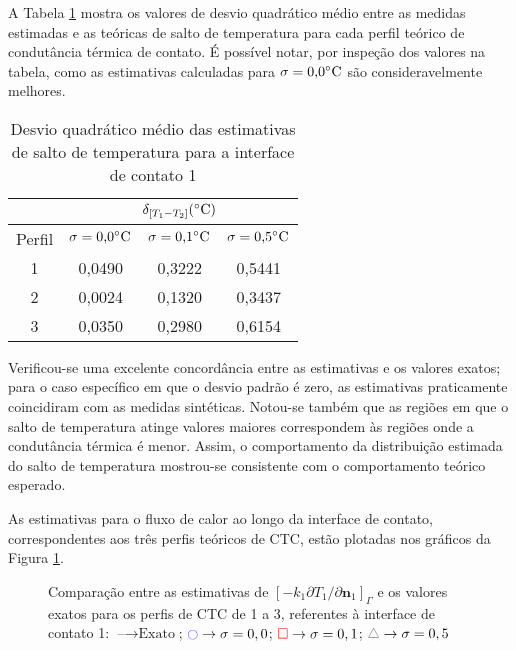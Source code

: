 A Tabela \ref{tabela_rms_delta_temperaturas_interface_1} mostra os valores de desvio quadrático médio entre as medidas estimadas e as teóricas de salto de temperatura para cada perfil teórico de condutância térmica de contato. É possível notar, por inspeção dos valores na tabela, como as estimativas calculadas para $\sigma = \text{0,0}\celsius$ são consideravelmente melhores.
\begin{table}[H]
	\centering
	\caption{Desvio quadrático médio das estimativas de salto de temperatura para a interface de contato 1}
	\begin{tabular}{c|c|c|c|}
		\cline{2-4}
		& \multicolumn{3}{c|}{$\delta_{[T_1 - T_2]} (\celsius)$} \\ \hline
		\multicolumn{1}{|c|}{Perfil} & $\sigma = \text{0,0}\celsius$   & $\sigma = \text{0,1}\celsius$    & $\sigma = \text{0,5}\celsius$  \\ \hline
		\multicolumn{1}{|c|}{1}      &  0,0490      & 0,3222       & 0,5441       \\ \hline
		\multicolumn{1}{|c|}{2}      &  0,0024      & 0,1320       & 0,3437      \\ \hline
		\multicolumn{1}{|c|}{3}      &  0,0350      & 0,2980       & 0,6154      \\ \hline
	\end{tabular}
	\label{tabela_rms_delta_temperaturas_interface_1}
\end{table}

Verificou-se uma excelente concordância entre as estimativas e os valores exatos; para o caso específico em que o desvio padrão é zero, as estimativas praticamente coincidiram com as medidas sintéticas. Notou-se também que as regiões em que o salto de temperatura atinge valores maiores correspondem às regiões onde a condutância térmica é menor. Assim, o comportamento da distribuição estimada do salto de temperatura mostrou-se consistente com o comportamento teórico esperado.

As estimativas para o fluxo de calor ao longo da interface de contato, correspondentes aos três perfis teóricos de CTC, estão plotadas nos gráficos da Figura \ref{figura_fluxo_calor_interface_01}.  
\begin{figure}[H]
	\caption{Comparação entre as estimativas de $[-k_1 {\partial T_1}/{\partial\mathbf{n}_1}]_\Gamma$ e os valores exatos para os perfis de CTC de 1 a 3, referentes à interface de contato 1: $\text{--} \rightarrow \text{Exato}$; $\textcolor{blue}{\ocircle} \rightarrow \sigma = 0,0$; $\textcolor{red}{\square} \rightarrow \sigma = 0,1$; $\textcolor{gray}{\triangle} \rightarrow \sigma = 0,5$}
	\label{figura_fluxo_calor_interface_01}
\end{figure}

